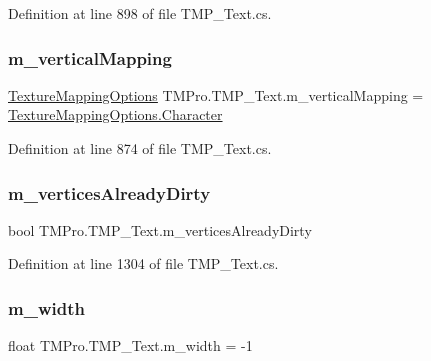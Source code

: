 Definition at line 898 of file T\+M\+P\+\_\+\+Text.\+cs.

\mbox{\label{class_t_m_pro_1_1_t_m_p___text_a9003aeb50443cb0aab1e604103b871b3}} 
\subsubsection{\texorpdfstring{m\_verticalMapping}{m\_verticalMapping}}
{\footnotesize\ttfamily \mbox{\hyperlink{namespace_t_m_pro_ab5c7877e6f736cba8b501c877bf5b612}{Texture\+Mapping\+Options}} T\+M\+Pro.\+T\+M\+P\+\_\+\+Text.\+m\+\_\+vertical\+Mapping = \mbox{\hyperlink{namespace_t_m_pro_ab5662f47179bf1b81c575ecf80b24065a76a40e4f974fd895a0a2598c1cee28b4}{Texture\+Mapping\+Options.\+Character}}\hspace{0.3cm}{\ttfamily [protected]}}



Definition at line 874 of file T\+M\+P\+\_\+\+Text.\+cs.

\mbox{\label{class_t_m_pro_1_1_t_m_p___text_a80828e6a0264d6edb7b1299702d7f599}} 
\subsubsection{\texorpdfstring{m\_verticesAlreadyDirty}{m\_verticesAlreadyDirty}}
{\footnotesize\ttfamily bool T\+M\+Pro.\+T\+M\+P\+\_\+\+Text.\+m\+\_\+vertices\+Already\+Dirty\hspace{0.3cm}{\ttfamily [protected]}}



Definition at line 1304 of file T\+M\+P\+\_\+\+Text.\+cs.

\mbox{\label{class_t_m_pro_1_1_t_m_p___text_ac3e220c987a26f47489667bee3cef006}} 
\subsubsection{\texorpdfstring{m\_width}{m\_width}}
{\footnotesize\ttfamily float T\+M\+Pro.\+T\+M\+P\+\_\+\+Text.\+m\+\_\+width = -\/1\hspace{0.3cm}{\ttfamily [protected]}}



